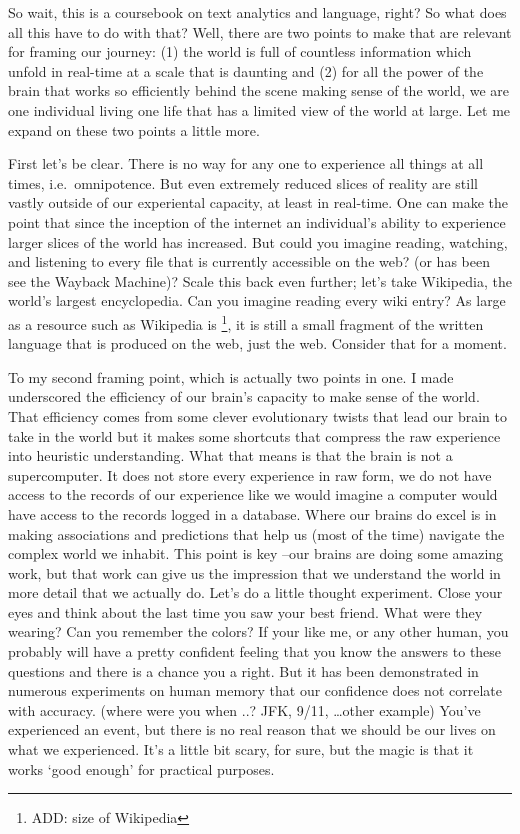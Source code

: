 \documentclass[
]{article}
\begin{document}
So wait, this is a coursebook on text analytics and language, right? So what does all this have to do with that? Well, there are two points to make that are relevant for framing our journey: (1) the world is full of countless information which unfold in real-time at a scale that is daunting and (2) for all the power of the brain that works so efficiently behind the scene making sense of the world, we are one individual living one life that has a limited view of the world at large. Let me expand on these two points a little more.

First let's be clear. There is no way for any one to experience all things at all times, i.e.~omnipotence. But even extremely reduced slices of reality are still vastly outside of our experiental capacity, at least in real-time. One can make the point that since the inception of the internet an individual's ability to experience larger slices of the world has increased. But could you imagine reading, watching, and listening to every file that is currently accessible on the web? (or has been see the Wayback Machine)? Scale this back even further; let's take Wikipedia, the world's largest encyclopedia. Can you imagine reading every wiki entry? As large as a resource such as Wikipedia is \footnote{ADD: size of Wikipedia}, it is still a small fragment of the written language that is produced on the web, just the web. Consider that for a moment.

To my second framing point, which is actually two points in one. I made underscored the efficiency of our brain's capacity to make sense of the world. That efficiency comes from some clever evolutionary twists that lead our brain to take in the world but it makes some shortcuts that compress the raw experience into heuristic understanding. What that means is that the brain is not a supercomputer. It does not store every experience in raw form, we do not have access to the records of our experience like we would imagine a computer would have access to the records logged in a database. Where our brains do excel is in making associations and predictions that help us (most of the time) navigate the complex world we inhabit. This point is key --our brains are doing some amazing work, but that work can give us the impression that we understand the world in more detail that we actually do. Let's do a little thought experiment. Close your eyes and think about the last time you saw your best friend. What were they wearing? Can you remember the colors? If your like me, or any other human, you probably will have a pretty confident feeling that you know the answers to these questions and there is a chance you a right. But it has been demonstrated in numerous experiments on human memory that our confidence does not correlate with accuracy. (where were you when ..? JFK, 9/11, \ldots other example) You've experienced an event, but there is no real reason that we should be our lives on what we experienced. It's a little bit scary, for sure, but the magic is that it works `good enough' for practical purposes.
\end{document}
